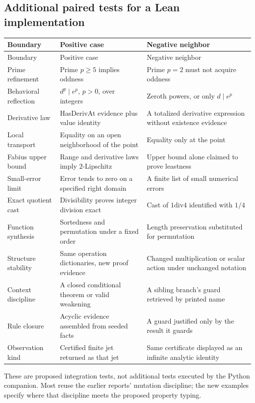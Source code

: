 \documentclass[11pt,a4paper]{article}
\theoremstyle{definition}
\theoremstyle{remark}
\begin{document}
\subsection{Additional paired tests for a Lean implementation}
\begin{longtable}{@{}L{33mm}L{57mm}L{61mm}@{}}
\toprule
Boundary & Positive case & Negative neighbor\\
\midrule
\endfirsthead
\toprule
Boundary & Positive case & Negative neighbor\\
\midrule
\endhead
Prime refinement & Prime $p\ge5$ implies oddness & Prime $p=2$ must not acquire oddness\\
Behavioral reflection & $d^p\mid e^p$, $p>0$, over integers & Zeroth powers, or only $d\mid e^p$\\
Derivative law & HasDerivAt evidence plus value identity & A totalized derivative expression without existence evidence\\
Local transport & Equality on an open neighborhood of the point & Equality only at the point\\
Fabius upper bound & Range and derivative laws imply $2$-Lipschitz & Upper bound alone claimed to prove leastness\\
Small-error limit & Error tends to zero on a specified right domain & A finite list of small numerical errors\\
Exact quotient cast & Divisibility proves integer division exact & Cast of $1\mathbin{\mathrm{div}}4$ identified with $1/4$\\
Function synthesis & Sortedness and permutation under a fixed order & Length preservation substituted for permutation\\
Structure stability & Same operation dictionaries, new proof evidence & Changed multiplication or scalar action under unchanged notation\\
Context discipline & A closed conditional theorem or valid weakening & A sibling branch's guard retrieved by printed name\\
Rule closure & Acyclic evidence assembled from seeded facts & A guard justified only by the result it guards\\
Observation kind & Certified finite jet returned as that jet & Same certificate displayed as an infinite analytic identity\\
\bottomrule
\end{longtable}
These are proposed integration tests, not additional tests executed by the Python companion. Most reuse the earlier reports' mutation discipline; the new examples specify where that discipline meets the proposed property typing.
\end{document}
